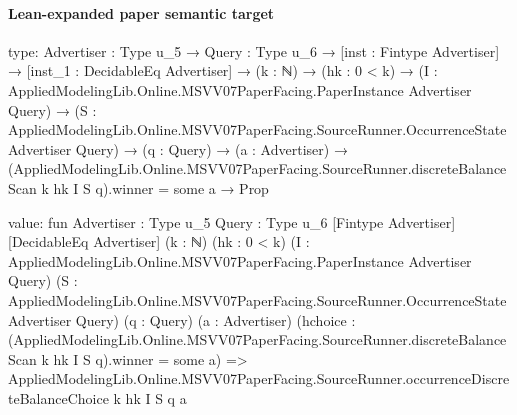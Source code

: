 \documentclass[10pt]{article}
\begin{document}
\paragraph{Lean-expanded paper semantic target}
\begin{ReviewVerbatim}
type:
{Advertiser : Type u_5} →
  {Query : Type u_6} →
    [inst : Fintype Advertiser] →
      [inst_1 : DecidableEq Advertiser] →
        (k : ℕ) →
          (hk : 0 < k) →
            (I : AppliedModelingLib.Online.MSVV07PaperFacing.PaperInstance Advertiser Query) →
              (S : AppliedModelingLib.Online.MSVV07PaperFacing.SourceRunner.OccurrenceState Advertiser Query) →
                (q : Query) →
                  (a : Advertiser) →
                    (AppliedModelingLib.Online.MSVV07PaperFacing.SourceRunner.discreteBalanceScan k hk I S q).winner =
                        some a →
                      Prop

value:
fun {Advertiser : Type u_5} {Query : Type u_6} [Fintype Advertiser] [DecidableEq Advertiser] (k : ℕ) (hk : 0 < k)
    (I : AppliedModelingLib.Online.MSVV07PaperFacing.PaperInstance Advertiser Query)
    (S : AppliedModelingLib.Online.MSVV07PaperFacing.SourceRunner.OccurrenceState Advertiser Query) (q : Query)
    (a : Advertiser)
    (hchoice :
      (AppliedModelingLib.Online.MSVV07PaperFacing.SourceRunner.discreteBalanceScan k hk I S q).winner = some a) =>
  AppliedModelingLib.Online.MSVV07PaperFacing.SourceRunner.occurrenceDiscreteBalanceChoice k hk I S q a
\end{ReviewVerbatim}
\end{document}
